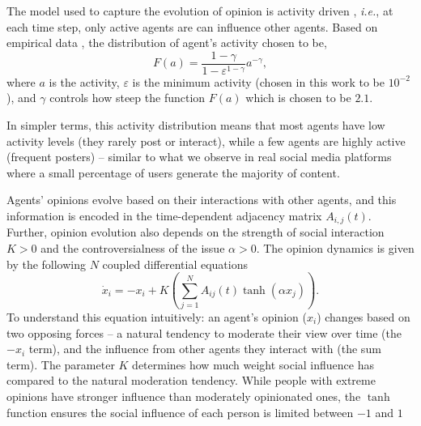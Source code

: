 The model used to capture the evolution of opinion is activity driven \cite{activity-driven-modeling-of-time-varying-networks, topological-properties-of-time-integrated-activity-driven-netowork, burstiness-and-aging-in-social-temporal-networks, controlling-contagion-processes-in-activity-driven-networks}, {\it i.e.}, at each time step, only active agents are can influence other agents. Based on empirical data \cite{activity-driven-modeling-of-time-varying-networks, burstiness-and-aging-in-social-temporal-networks}, the distribution of agent's activity chosen to be,
\begin{equation}
    \label{activities.eq}
      F(a) = \frac{1-\gamma}{1-\varepsilon^{1-\gamma}} a^{-\gamma},
\end{equation}
where $a$ is the activity, $\varepsilon$ is the minimum activity (chosen in this work to be $10^{-2}$), and $\gamma$ controls how steep the function $F(a)$ which is chosen to be $2.1$. 

In simpler terms, this activity distribution means that most agents have low activity levels (they rarely post or interact), while a few agents are highly active (frequent posters) – similar to what we observe in real social media platforms where a small percentage of users generate the majority of content.

Agents' opinions evolve based on their interactions with other agents, and this information is encoded in the time-dependent adjacency matrix $A_{i, j}(t)$. Further, opinion evolution also depends on the strength of social interaction $K > 0$ and the controversialness of the issue $\alpha > 0$. The opinion dynamics is given by 
the following $N$ coupled differential equations \cite{modeling-echo-chambers-and-polarizaiton-dynamics-in-social-networks}
\begin{equation}
    \label{main.eq}
    \dot{x}_i= -x_i + K \left(\sum^{N}_{j=1} A_{ij} (t)  \tanh{(\alpha x_j)}\right).
\end{equation}
To understand this equation intuitively: an agent's opinion ($x_i$) changes based on two opposing forces – a natural tendency to moderate their view over time (the $-x_i$ term), and the influence from other agents they interact with (the sum term). The parameter $K$ determines how much weight social influence has compared to the natural moderation tendency. While people with extreme opinions have stronger influence than moderately opinionated ones, the $\tanh$ function ensures the social influence of each person is limited between $-1$ and $1$

